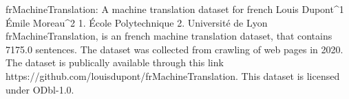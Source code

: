 
frMachineTranslation: A machine translation dataset for french
Louis Dupont^1 Émile Moreau^2
1. École Polytechnique 2. Université de Lyon
frMachineTranslation, is an french machine translation dataset, that contains 7175.0 sentences.
The dataset was collected from crawling of web pages in 2020. 
The dataset is publically available through this link https://github.com/louisdupont/frMachineTranslation. This dataset is licensed under ODbl-1.0.

